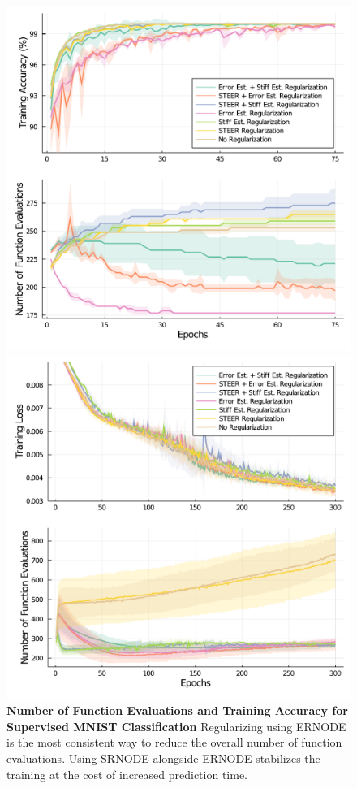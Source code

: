 \begin{figure}[t]
  \centering
  \begin{minipage}[c]{0.49\textwidth}
    \includegraphics[width=\linewidth]{../figures/global_regularization_neural_des/mnist_node_v2}
    \caption{\textbf{Number of Function Evaluations and Training Accuracy for Supervised MNIST Classification} Regularizing using ERNODE is the most consistent way to reduce the overall number of function evaluations. Using SRNODE alongside ERNODE stabilizes the training at the cost of increased prediction time.}
    \label{fig:mnist_node_globalreg}
  \end{minipage}
  \hfill
  \begin{minipage}[c]{0.49\textwidth}
    \includegraphics[width=\linewidth]{../figures/global_regularization_neural_des/latent_ode_v2}

\end{minipage}
\end{figure}
